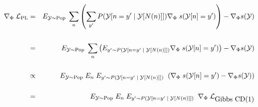 {

{\huge
\begin{eqnarray*}
\nabla_\Phi\;{\cal L}_{\mathrm{PL}} & = & E_{{\cal Y} \sim \mathrm{Pop}}\;\sum_n \left(\sum_{y'} P({\cal Y}[n=y'\;|\;{\cal Y}[N(n)]]) \nabla_\Phi\;s({\cal Y}[n]=y')\right) - \nabla_\Phi s({\cal Y}) \\
\\
& = & E_{{\cal Y} \sim \mathrm{Pop}}\;\sum_n \left(E_{y' \sim P({\cal Y}[n=y'\;|\;{\cal Y}[N(n)]])} \nabla_\Phi\;s({\cal Y}[n]=y')\right) - \nabla_\Phi s({\cal Y}) \\
\\
& \propto & E_{{\cal Y} \sim \mathrm{Pop}}\;E_n\; E_{y' \sim P({\cal Y}[n=y'\;|\;{\cal Y}[N(n)]])}\;\; (\nabla_\Phi\;s({\cal Y}[n]=y') - \nabla_\Phi s({\cal Y})) \\
\\
& = & E_{{\cal Y} \sim \mathrm{Pop}}\;E_n\; E_{y' \sim P({\cal Y}[n=y'\;|\;{\cal Y}[N(n)]])}\;\; \nabla_\Phi\;{\cal L}_{\mbox{Gibbs CD(1)}}
\end{eqnarray*}
}

}

